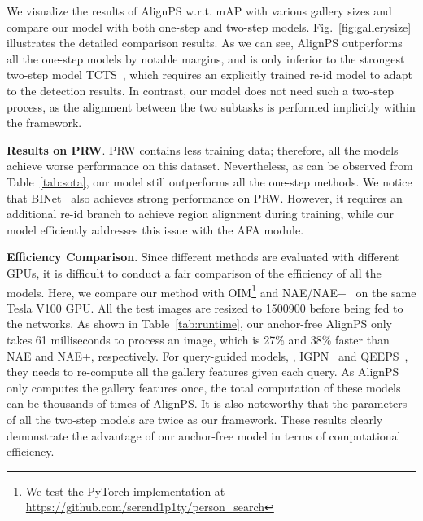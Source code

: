 \documentclass[final]{cvpr}
\begin{document}
We visualize the results of AlignPS w.r.t. mAP with various gallery sizes and compare our model with both one-step and two-step models. Fig.~\ref{fig:gallerysize} illustrates the detailed comparison results. As we can see, AlignPS outperforms all the one-step models by notable margins, and is only inferior to the strongest two-step model TCTS~\cite{DBLP:conf/cvpr/WangMCSC20}, which requires an explicitly trained re-id model to adapt to the detection results. In contrast, our model does not need such a two-step process, as the alignment between the two subtasks is performed implicitly within the framework.

\textbf{Results on PRW}.
PRW contains less training data; therefore, all the models achieve worse performance on this dataset. Nevertheless, as can be observed from Table~\ref{tab:sota}, our model still outperforms all the one-step methods. We notice that BINet~\cite{DBLP:conf/cvpr/DongZST20a} also achieves strong performance on PRW. However, it requires an additional re-id branch to achieve region alignment during training, while our model efficiently addresses this issue with the AFA module.



\textbf{Efficiency Comparison}.
Since different methods are evaluated with different GPUs, it is difficult to conduct a fair comparison of the efficiency of all the models. Here, we compare our method with OIM\footnote{We test the PyTorch implementation at \url{https://github.com/serend1p1ty/person_search}} \cite{DBLP:conf/cvpr/XiaoLWLW17} and NAE/NAE+~\cite{DBLP:conf/cvpr/ChenZYS20} on the same Tesla V100 GPU. All the test images are resized to 1500900 before being fed to the networks. As shown in Table~\ref{tab:runtime}, our anchor-free AlignPS only takes 61 milliseconds to process an image, which is 27\% and 38\% faster than NAE and NAE+, respectively. For query-guided models, \eg, IGPN~\cite{DBLP:conf/cvpr/DongZST20} and QEEPS~\cite{DBLP:conf/cvpr/MunjalATG19}, they needs to re-compute all the gallery features given each query. As AlignPS only computes the gallery features once, the total computation of these models can be thousands of times of AlignPS. It is also noteworthy that the parameters of all the two-step models are twice as our framework. These results clearly demonstrate the advantage of our anchor-free model in terms of computational efficiency.
\end{document}
